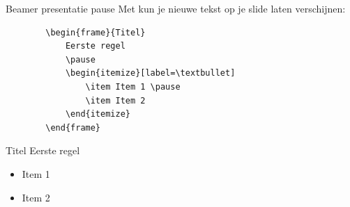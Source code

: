 
\begin{frame}[fragile=singleslide]{Beamer presentatie pause}
    Met \texttt{\pause} kun je nieuwe tekst op je slide laten verschijnen:
    
    \begin{verbatim}
        \begin{frame}{Titel}
            Eerste regel
            \pause
            \begin{itemize}[label=\textbullet]
                \item Item 1 \pause
                \item Item 2
            \end{itemize}
        \end{frame}

    \end{verbatim}
\end{frame}


\begin{frame}{Titel}
Eerste regel
\pause
\begin{itemize}[label=\textbullet]
    \item Item 1 \pause
    \item Item 2
\end{itemize}
\end{frame}


